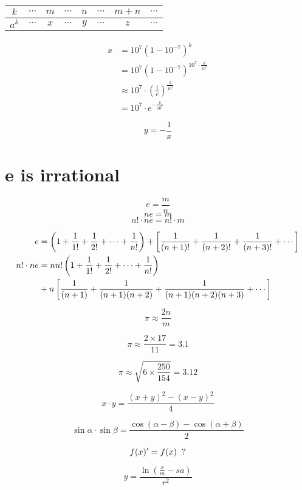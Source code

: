 \begin{tabular}{c|ccccccc}
\hline
$k$  & $\cdots$ & $m$ & $\cdots$ & $n$ & $\cdots$ & $m+n$ & $\cdots$ \\
\hline
$a^k$  & $\cdots$ &  $x$  & $\cdots$ & $y$ & $\cdots$ & $z$ & $\cdots$ \\
\hline
\end{tabular}

\begin{align*}
 x & = 10^7(1- 10^{-7})^k   \\
   &=  10^7(1- 10^{-7})^{10^7 \cdot \frac k {10^7} } \\
   & \approx  10^7 \cdot  \left(\frac{1}{e}\right)^\frac{k}{10^7}  \\
   &  = \displaystyle 10^7 \cdot  e^{-\frac{k}{10^7} }
\end{align*}


$$ y = - \frac{1}{x} $$

\section{ e is irrational }


$$ e = \frac m n $$
$$ ne =  m $$ 
$$ n! \cdot ne = n! \cdot m $$
 
 \begin{align*}
 e & =  \left( 1 + {1 \over 1!} + {1\over 2!} + \cdots + {1 \over n!}   \right)   +  \left[ {1 \over (n+1)! }  + {1 \over (n+2)!}  +  {1 \over (n+3)! } + \cdots  \right] \\
 n! \cdot ne & =   n n! \left( 1 + {1 \over 1!} + {1\over 2!}  + \cdots + {1 \over n!}   \right)  \\
 &   + n\left[ {1 \over (n+1)}  + {1 \over (n+1)(n+2)}  + {1 \over (n+1)(n+2)(n+3)} + \cdots \right]
 \end {align*}
 
 
 $$ \pi \approx  \frac{2n}{m}  $$
 
 $$  \pi \approx   \frac {2 \times 17}{11} = 3.1 $$  
 
 $$ \pi \approx  \sqrt {6 \times \frac{250}{154}}  =  3.12  $$
 
$$ x \cdot y = \frac{(x+y)^2 - (x-y)^2}{4} $$

$$ \sin \alpha \cdot \sin \beta = \frac{ \cos(\alpha-\beta) - \cos(\alpha + \beta)}{2} $$ 

$$  f(x)' = f(x)    \hspace{0.2cm} ?$$

$$ y = \frac{\ln (\frac{x}{m} - sa)}{r^2} $$

